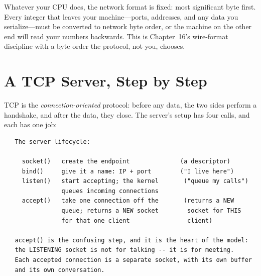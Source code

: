 \begin{ruleofthumb}
Whatever your CPU does, the network format is fixed: most significant
byte first. Every integer that leaves your machine---ports, addresses,
and any data you serialize---must be converted to network byte order,
or the machine on the other end will read your numbers backwards. This
is Chapter~16's wire-format discipline with a byte order the protocol,
not you, chooses.
\end{ruleofthumb}

\section{A TCP Server, Step by Step}

TCP is the \emph{connection-oriented} protocol: before any data, the
two sides perform a handshake, and after the data, they close. The
server's setup has four calls, and each has one job:

\begin{verbatim}
   The server lifecycle:

     socket()   create the endpoint              (a descriptor)
     bind()     give it a name: IP + port        ("I live here")
     listen()   start accepting; the kernel       ("queue my calls")
                queues incoming connections
     accept()   take one connection off the       (returns a NEW
                queue; returns a NEW socket        socket for THIS
                for that one client                client)

   accept() is the confusing step, and it is the heart of the model:
   the LISTENING socket is not for talking -- it is for meeting.
   Each accepted connection is a separate socket, with its own buffer
   and its own conversation.
\end{verbatim}

